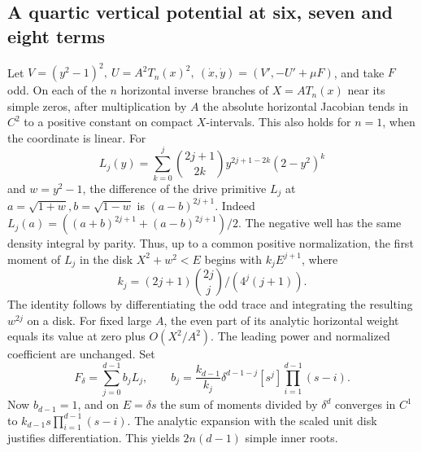\subsection{A quartic vertical potential at six, seven and eight terms}\label{sup:quartic}
Let \(V=(y^2-1)^2,\ U=A^2T_n(x)^2,\ (\dot x,\dot y)=(V',-U'+\mu F)\), and take \(F\) odd. On each of the \(n\) horizontal inverse branches of \(X=AT_n(x)\) near its simple zeros, after multiplication by \(A\) the absolute horizontal Jacobian tends in \(C^2\) to a positive constant on compact \(X\)-intervals. This also holds for \(n=1\), when the coordinate is linear. For
\[
 L_j(y)=\sum_{k=0}^j\binom{2j+1}{2k}y^{2j+1-2k}(2-y^2)^k
\]
and \(w=y^2-1\), the difference of the drive primitive \(L_j\) at \(a=\sqrt{1+w},b=\sqrt{1-w}\) is \((a-b)^{2j+1}\). Indeed \(L_j(a)=((a+b)^{2j+1}+(a-b)^{2j+1})/2\). The negative well has the same density integral by parity. Thus, up to a common positive normalization, the first moment of \(L_j\) in the disk \(X^2+w^2<E\) begins with \(k_j E^{j+1}\), where
\[
 k_j=(2j+1)\binom{2j}{j}/(4^j(j+1)).
\]
The identity follows by differentiating the odd trace and integrating the resulting \(w^{2j}\) on a disk. For fixed large \(A\), the even part of its analytic horizontal weight equals its value at zero plus \(O(X^2/A^2)\). The leading power and normalized coefficient are unchanged. Set
\[
 F_\delta=\sum_{j=0}^{d-1}b_j L_j,\qquad
 b_j=\frac{k_{d-1}}{k_j}\delta^{d-1-j}[s^j]\prod_{i=1}^{d-1}(s-i).
\]
Now \(b_{d-1}=1\), and on \(E=\delta s\) the sum of moments divided by \(\delta^d\) converges in \(C^1\) to \(k_{d-1}s\prod_{i=1}^{d-1}(s-i)\). The analytic expansion with the scaled unit disk justifies differentiation. This yields \(2n(d-1)\) simple inner roots.


